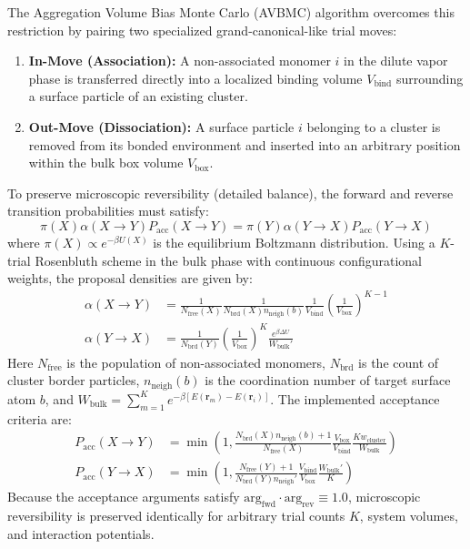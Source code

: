 \documentclass[11pt,a4paper]{article}
\begin{document}
The Aggregation Volume Bias Monte Carlo (AVBMC) algorithm \cite{chen2000avbmc,chen2001avbmc} overcomes this restriction by pairing two specialized grand-canonical-like trial moves:
\begin{enumerate}
    \item \textbf{In-Move (Association):} A non-associated monomer $i$ in the dilute vapor phase is transferred directly into a localized binding volume $V_{\mathrm{bind}}$ surrounding a surface particle of an existing cluster.
    \item \textbf{Out-Move (Dissociation):} A surface particle $i$ belonging to a cluster is removed from its bonded environment and inserted into an arbitrary position within the bulk box volume $V_{\mathrm{box}}$.
\end{enumerate}

To preserve microscopic reversibility (detailed balance), the forward and reverse transition probabilities must satisfy:
\begin{equation}
\pi(X) \alpha(X \to Y) P_{\mathrm{acc}}(X \to Y) = \pi(Y) \alpha(Y \to X) P_{\mathrm{acc}}(Y \to X)
\label{eq:detailed_balance}
\end{equation}
where $\pi(X) \propto e^{-\beta U(X)}$ is the equilibrium Boltzmann distribution. Using a $K$-trial Rosenbluth scheme in the bulk phase with continuous configurational weights, the proposal densities are given by:
\begin{align}
\alpha(X \to Y) &= \frac{1}{N_{\mathrm{free}}(X)} \frac{1}{N_{\mathrm{brd}}(X) n_{\mathrm{neigh}}(b)} \frac{1}{V_{\mathrm{bind}}} \left(\frac{1}{V_{\mathrm{box}}}\right)^{K-1} \\
\alpha(Y \to X) &= \frac{1}{N_{\mathrm{brd}}(Y)} \left(\frac{1}{V_{\mathrm{box}}}\right)^K \frac{e^{\beta \Delta U}}{W_{\mathrm{bulk}}'}
\end{align}
Here $N_{\mathrm{free}}$ is the population of non-associated monomers, $N_{\mathrm{brd}}$ is the count of cluster border particles, $n_{\mathrm{neigh}}(b)$ is the coordination number of target surface atom $b$, and $W_{\mathrm{bulk}} = \sum_{m=1}^K e^{-\beta [E(\mathbf{r}_m) - E(\mathbf{r}_i)]}$. The implemented acceptance criteria are:
\begin{align}
P_{\mathrm{acc}}(X \to Y) &= \min\left(1, \frac{N_{\mathrm{brd}}(X) n_{\mathrm{neigh}}(b) + 1}{N_{\mathrm{free}}(X)} \frac{V_{\mathrm{box}}}{V_{\mathrm{bind}}} \frac{K w_{\mathrm{cluster}}}{W_{\mathrm{bulk}}}\right) \label{eq:acc_in} \\
P_{\mathrm{acc}}(Y \to X) &= \min\left(1, \frac{N_{\mathrm{free}}(Y) + 1}{N_{\mathrm{brd}}(Y) n_{\mathrm{neigh}}'} \frac{V_{\mathrm{bind}}}{V_{\mathrm{box}}} \frac{W_{\mathrm{bulk}}'}{K}\right) \label{eq:acc_out}
\end{align}
Because the acceptance arguments satisfy $\text{arg}_{\mathrm{fwd}} \cdot \text{arg}_{\mathrm{rev}} \equiv 1.0$, microscopic reversibility is preserved identically for arbitrary trial counts $K$, system volumes, and interaction potentials.
\end{document}
